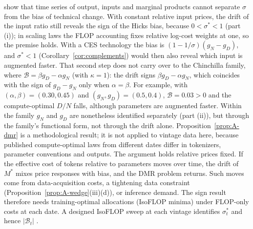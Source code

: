 \begin{remark}
\citet{diamond1978measurement} show that time series of output, inputs and marginal products cannot separate $\sigma$
from the bias of technical change. With constant relative input prices, the drift of the input ratio still reveals the
sign of the Hicks bias, because $0<\sigma^*<1$ (part (i)); in scaling laws the FLOP accounting fixes relative log-cost weights
at one, so the premise holds. With a CES technology the bias is $(1-1/\sigma)(g_N-g_D)$, and $\sigma^*<1$
(Corollary~\ref{cor:complements}) would then also reveal which input is augmented faster. That second step does not carry
over to the Chinchilla family, where $\mathcal B=\beta g_D-\alpha g_N$ (with $\kappa=1$): the drift signs
$\beta g_D-\alpha g_N$, which coincides with the sign of $g_D-g_N$ only when $\alpha=\beta$. For example, with
$(\alpha,\beta)=(0.30,0.45)$ and $(g_N,g_D)=(0.5,0.4)$, $\mathcal B=0.03>0$ and the compute-optimal $D/N$ falls, although
parameters are augmented faster. Within the family $g_N$ and $g_D$ are nonetheless identified separately (part (ii)), but
through the family's functional form, not through the drift alone. Proposition~\ref{prop:A-dmr} is a methodological
result; it is not applied to vintage data here, because published compute-optimal laws from different dates differ in
tokenizers, parameter conventions and outputs. The argument holds relative prices fixed. If the effective cost of tokens
relative to parameters moves over time, the drift of $M^*$ mixes price responses with bias, and the DMR problem returns. Such
moves come from data-acquisition costs, a tightening data constraint (Proposition~\ref{prop:A-wedge}(iii)(d)), or inference demand.
The sign result therefore needs training-optimal allocations (IsoFLOP minima) under FLOP-only costs at each date. A designed IsoFLOP sweep at each vintage identifies $\sigma^*_t$ and
hence $|\mathcal B_t|$ \citep[compare the insignificant, negatively correlated individual augmentation terms with a
well-identified sum in][]{ho2024algorithmic}.
\end{remark}

